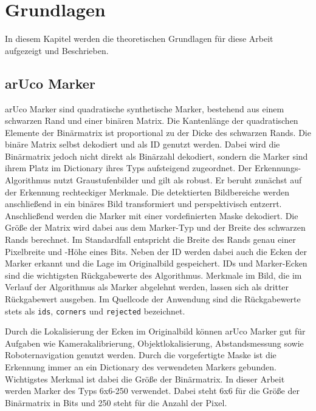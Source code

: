 ﻿\chapter{Grundlagen}

In diesem Kapitel werden die theoretischen Grundlagen für diese Arbeit aufgezeigt und Beschrieben. 

\section{arUco Marker}\label{arucoMarker}

arUco Marker sind quadratische synthetische Marker, bestehend aus einem schwarzen Rand und einer binären Matrix. Die Kantenlänge der quadratischen Elemente der Binärmatrix ist proportional zu der Dicke des schwarzen Rands. Die binäre Matrix selbst dekodiert und
als ID genutzt werden. Dabei wird die Binärmatrix jedoch nicht direkt als Binärzahl dekodiert, sondern die Marker sind ihrem Platz im Dictionary ihres Typs aufsteigend zugeordnet.
Der Erkennungs-Algorithmus nutzt Graustufenbilder und gilt als robust. 
Er beruht zunächst auf der Erkennung rechteckiger Merkmale. 
Die detektierten Bildbereiche werden anschließend in ein binäres Bild transformiert und perspektivisch entzerrt. 
Anschließend werden die Marker mit einer vordefinierten Maske dekodiert.
Die Größe der Matrix wird dabei aus dem Marker-Typ und der Breite des schwarzen Rands berechnet.
Im Standardfall entspricht die Breite des Rands genau einer Pixelbreite und -Höhe eines Bits. 
Neben der ID werden dabei auch die Ecken der Marker erkannt und die Lage im Originalbild gespeichert. 
IDs und Marker-Ecken sind die wichtigsten Rückgabewerte des Algorithmus.
Merkmale im Bild, die im Verlauf der Algorithmus als Marker abgelehnt werden, lassen sich als dritter Rückgabewert ausgeben.
Im Quellcode der Anwendung sind die Rückgabewerte stets als \verb|ids|, \verb|corners| und \verb|rejected| bezeichnet.

Durch die Lokalisierung der Ecken im Originalbild können arUco Marker gut für Aufgaben wie Kamerakalibrierung, Objektlokalisierung, Abstandsmessung sowie Roboternavigation genutzt werden.
\cite[OpenCV arUco]{OpenCVaruco}
Durch die vorgefertigte Maske ist die Erkennung immer an ein Dictionary des verwendeten Markers gebunden. 
Wichtigstes Merkmal ist dabei die Größe der Binärmatrix. In dieser Arbeit werden Marker des Typs 6x6-250 verwendet.
Dabei steht 6x6 für die Größe der Binärmatrix in Bits und 250 steht für die Anzahl der Pixel.

